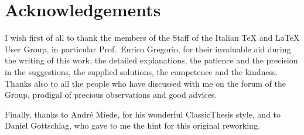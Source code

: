 
\begingroup
\let\clearpage\relax
\let\cleardoublepage\relax
\let\cleardoublepage\relax

\chapter*{Acknowledgements}

I wish first of all to thank the members of the Staff of the Italian \TeX{} and \LaTeX{} User Group, in particular Prof.~Enrico Gregorio, for their invaluable aid during the writing of this work, the detailed explanations, the patience and the precision in the suggestions, the supplied solutions, the competence and the kindness. Thanks also to all the people who have discussed with me on the forum of the Group, prodigal of precious observations and good advices.

Finally, thanks to Andr\'e Miede, for his wonderful ClassicThesis style, and to Daniel Gottschlag, who gave to me the hint for this original reworking.

\endgroup



